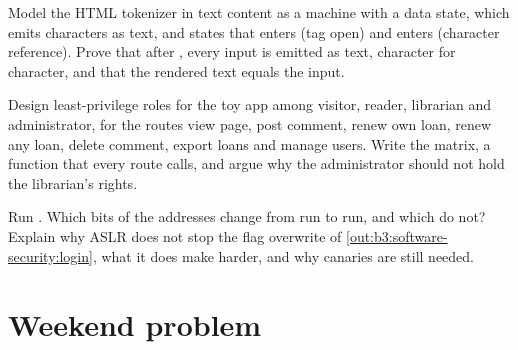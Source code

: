 \begin{exercise}[$\star\star\star$]\label{exo:b3:software-security:10}
Model the HTML tokenizer in text content as a machine with a data state, which emits characters as text, and states that \code{<} enters (tag open) and \code{&} enters (character reference). Prove that after , every input is emitted as text, character for character, and that the rendered text equals the input.
\end{exercise}

\begin{exercise}[$\star\star\star$]\label{exo:b3:software-security:11}
Design least-privilege roles for the toy app among visitor, reader, librarian and administrator, for the routes view page, post comment, renew own loan, renew any loan, delete comment, export loans and manage users. Write the matrix, a function that every route calls, and argue why the administrator should not hold the librarian's rights.
\end{exercise}

\begin{exercise}[$\star\star\star$]\label{exo:b3:software-security:12}
Run . Which bits of the addresses change from run to run, and which do not? Explain why ASLR does not stop the flag overwrite of \cref{out:b3:software-security:login}, what it does make harder, and why canaries are still needed.
\end{exercise}

\section{Weekend problem}\label{sec:b3:software-security:problem}

